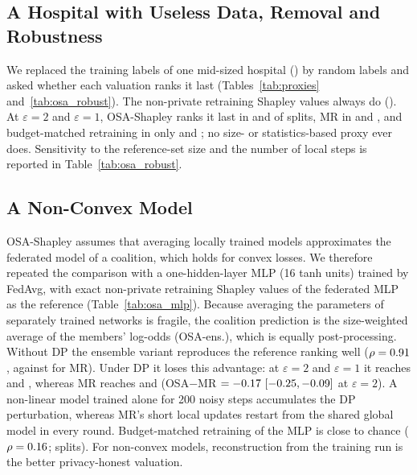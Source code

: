 \subsection{A Hospital with Useless Data, Removal and Robustness}
\label{sec:p19_robust}
We replaced the training labels of one mid-sized hospital (\corrHosp) by random labels and asked whether each valuation ranks it last (Tables~\ref{tab:proxies} and~\ref{tab:osa_robust}). The non-private retraining Shapley values always do (\corrTruth). At $\varepsilon=2$ and $\varepsilon=1$, OSA-Shapley ranks it last in \corrOsaTwo{} and \corrOsaOne{} of splits, MR in \corrMrTwo{} and \corrMrOne, and budget-matched retraining in only \corrBmTwo{} and \corrBmOne; no size- or statistics-based proxy ever does. Sensitivity to the reference-set size and the number of local steps is reported in Table~\ref{tab:osa_robust}.

\subsection{A Non-Convex Model}
\label{sec:p19_mlp}
OSA-Shapley assumes that averaging locally trained models approximates the federated model of a coalition, which holds for convex losses. We therefore repeated the comparison with a one-hidden-layer MLP (16 tanh units) trained by FedAvg, with exact non-private retraining Shapley values of the federated MLP as the reference (Table~\ref{tab:osa_mlp}). Because averaging the parameters of separately trained networks is fragile, the coalition prediction is the size-weighted average of the members' log-odds (OSA-ens.), which is equally post-processing. Without DP the ensemble variant reproduces the reference ranking well ($\rho=0.91$, against \mlpMrNoDP{} for MR). Under DP it loses this advantage: at $\varepsilon=2$ and $\varepsilon=1$ it reaches \mlpOsaTwo{} and \mlpOsaOne{}, whereas MR reaches \mlpMrTwo{} and \mlpMrOne{} (OSA$-$MR $=-0.17\ [-0.25, -0.09]$ at $\varepsilon=2$). A non-linear model trained alone for 200 noisy steps accumulates the DP perturbation, whereas MR's short local updates restart from the shared global model in every round. Budget-matched retraining of the MLP is close to chance ($\rho=0.16$; \mlpBmSeeds{} splits). For non-convex models, reconstruction from the training run is the better privacy-honest valuation.


